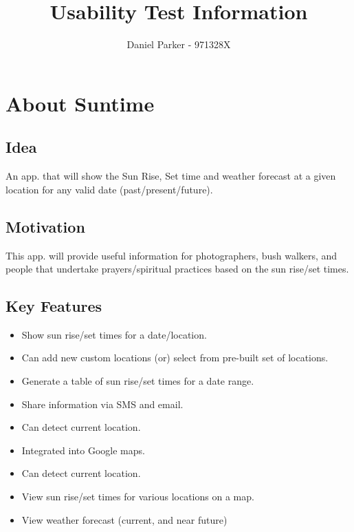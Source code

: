 \documentclass[a4paper, parskip=half]{scrartcl}
\title{Usability Test Information}
\author{Daniel Parker - 971328X}
\date{}
\begin{document}
\maketitle

\section{About Suntime}
\subsection{Idea}
An app. that will show the Sun Rise, Set time and weather forecast at a given
location for any valid date (past/present/future).

\subsection{Motivation}
This app. will provide useful information for photographers, bush walkers, and
people that undertake prayers/spiritual practices based on the sun rise/set
times.

\subsection{Key Features}
\begin{itemize}
  \item{Show sun rise/set times for a date/location.}
  \item{Can add new custom locations (or) select from pre-built set of locations.}
  \item{Generate a table of sun rise/set times for a date range.}
  \item{Share information via SMS and email.}
  \item{Can detect current location.}
  \item{Integrated into Google maps.}
  \item{Can detect current location.}
  \item{View sun rise/set times for various locations on a map.}
  \item{View weather forecast (current, and near future)}
\end{itemize}
\end{document}
